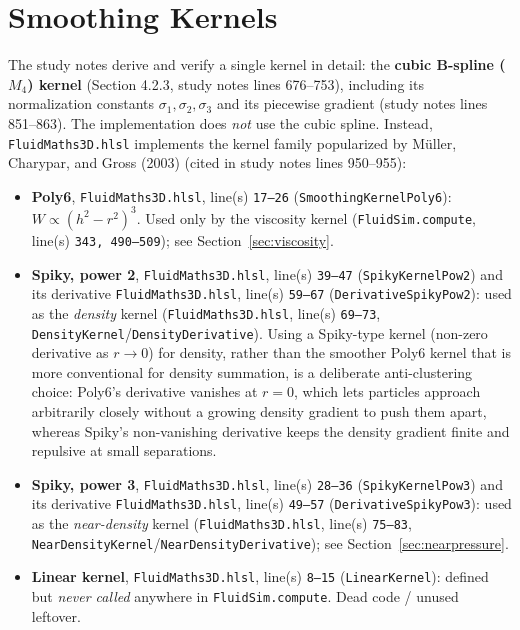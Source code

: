 \documentclass[11pt]{article}
\newcommand{\file}[1]{\texttt{#1}}
\newcommand{\loc}[2]{\texttt{#1}, line(s) \texttt{#2}}
\begin{document}
\section{Smoothing Kernels}

The study notes derive and verify a single kernel in detail: the
\textbf{cubic B-spline ($M_4$) kernel} (Section 4.2.3, study notes lines
676--753), including its normalization constants $\sigma_1,\sigma_2,\sigma_3$
and its piecewise gradient (study notes lines 851--863). The implementation
does \emph{not} use the cubic spline. Instead, \file{FluidMaths3D.hlsl}
implements the kernel family popularized by M\"uller, Charypar, and Gross
(2003) (cited in study notes lines 950--955):

\begin{itemize}
    \item \textbf{Poly6}, \loc{FluidMaths3D.hlsl}{17--26}
    (\texttt{SmoothingKernelPoly6}): $W\propto(h^2-r^2)^3$. Used only by the
    viscosity kernel (\loc{FluidSim.compute}{343, 490--509}); see
    Section~\ref{sec:viscosity}.
    \item \textbf{Spiky, power 2}, \loc{FluidMaths3D.hlsl}{39--47}
    (\texttt{SpikyKernelPow2}) and its derivative
    \loc{FluidMaths3D.hlsl}{59--67} (\texttt{DerivativeSpikyPow2}): used as
    the \emph{density} kernel (\loc{FluidMaths3D.hlsl}{69--73},
    \texttt{DensityKernel}/\texttt{DensityDerivative}). Using a
    Spiky-type kernel (non-zero derivative as $r\to0$) for density, rather
    than the smoother Poly6 kernel that is more conventional for density
    summation, is a deliberate anti-clustering choice: Poly6's derivative
    vanishes at $r=0$, which lets particles approach arbitrarily closely
    without a growing density gradient to push them apart, whereas Spiky's
    non-vanishing derivative keeps the density gradient finite and repulsive
    at small separations.
    \item \textbf{Spiky, power 3}, \loc{FluidMaths3D.hlsl}{28--36}
    (\texttt{SpikyKernelPow3}) and its derivative
    \loc{FluidMaths3D.hlsl}{49--57} (\texttt{DerivativeSpikyPow3}): used as
    the \emph{near-density} kernel (\loc{FluidMaths3D.hlsl}{75--83},
    \texttt{NearDensityKernel}/\texttt{NearDensityDerivative}); see
    Section~\ref{sec:nearpressure}.
    \item \textbf{Linear kernel}, \loc{FluidMaths3D.hlsl}{8--15}
    (\texttt{LinearKernel}): defined but \emph{never called} anywhere in
    \file{FluidSim.compute}. Dead code / unused leftover.
\end{itemize}
\end{document}
